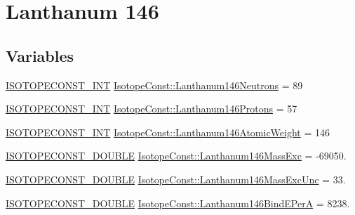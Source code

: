 \hypertarget{group___isotope_const-_lanthanum-_la146}{}\section{Lanthanum 146}
\label{group___isotope_const-_lanthanum-_la146}
\subsection*{Variables}
\begin{DoxyCompactItemize}
\item 
\mbox{\hyperlink{group___isotope_const-_macros_ga5f18360b3e99483a35c32d789e62621c}{I\+S\+O\+T\+O\+P\+E\+C\+O\+N\+S\+T\+\_\+\+I\+NT}} \mbox{\hyperlink{group___isotope_const-_lanthanum-_la146_gafd0228637cd799347ecb0216de8304d5}{Isotope\+Const\+::\+Lanthanum146\+Neutrons}} = 89
\item 
\mbox{\hyperlink{group___isotope_const-_macros_ga5f18360b3e99483a35c32d789e62621c}{I\+S\+O\+T\+O\+P\+E\+C\+O\+N\+S\+T\+\_\+\+I\+NT}} \mbox{\hyperlink{group___isotope_const-_lanthanum-_la146_ga08ac4a2d6a9a702328930e1a94586563}{Isotope\+Const\+::\+Lanthanum146\+Protons}} = 57
\item 
\mbox{\hyperlink{group___isotope_const-_macros_ga5f18360b3e99483a35c32d789e62621c}{I\+S\+O\+T\+O\+P\+E\+C\+O\+N\+S\+T\+\_\+\+I\+NT}} \mbox{\hyperlink{group___isotope_const-_lanthanum-_la146_gae3ae47e754429eeb6ef2e8241e021301}{Isotope\+Const\+::\+Lanthanum146\+Atomic\+Weight}} = 146
\item 
\mbox{\hyperlink{group___isotope_const-_macros_ga8f45a7272ce02c0b4c65c44636ed719a}{I\+S\+O\+T\+O\+P\+E\+C\+O\+N\+S\+T\+\_\+\+D\+O\+U\+B\+LE}} \mbox{\hyperlink{group___isotope_const-_lanthanum-_la146_ga0ac3b99c830493ff8056e500d7437bbf}{Isotope\+Const\+::\+Lanthanum146\+Mass\+Exc}} = -\/69050.
\item 
\mbox{\hyperlink{group___isotope_const-_macros_ga8f45a7272ce02c0b4c65c44636ed719a}{I\+S\+O\+T\+O\+P\+E\+C\+O\+N\+S\+T\+\_\+\+D\+O\+U\+B\+LE}} \mbox{\hyperlink{group___isotope_const-_lanthanum-_la146_gab8ff41e7dacc81a67d330e3f76d6aeb7}{Isotope\+Const\+::\+Lanthanum146\+Mass\+Exc\+Unc}} = 33.
\item 
\mbox{\hyperlink{group___isotope_const-_macros_ga8f45a7272ce02c0b4c65c44636ed719a}{I\+S\+O\+T\+O\+P\+E\+C\+O\+N\+S\+T\+\_\+\+D\+O\+U\+B\+LE}} \mbox{\hyperlink{group___isotope_const-_lanthanum-_la146_ga3f4e1df1776fe86d438d62942350c527}{Isotope\+Const\+::\+Lanthanum146\+Bind\+E\+PerA}} = 8238.
\item 

\end{DoxyCompactItemize}
